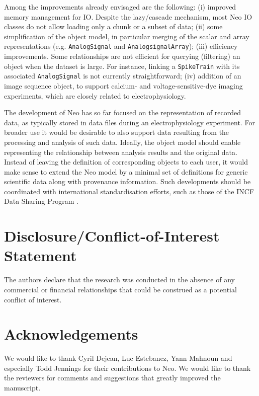 \documentclass{frontiers}
\begin{document}
Among the improvements already envisaged are the following:
(i) improved memory management for IO. Despite the lazy/cascade mechanism, most Neo IO classes do not allow loading only a chunk or a subset of data;
(ii) some simplification of the object model, in particular merging of the scalar and array representations (e.g. \lstinline`AnalogSignal` and \lstinline`AnalogsignalArray`);
(iii) efficiency improvements. Some relationships are not efficient for querying (filtering) an object when the dataset is large. For instance, linking a \lstinline`SpikeTrain` with its associated \lstinline`AnalogSignal` is not currently straightforward;
(iv) addition of an image sequence object, to support calcium- and voltage-sensitive-dye imaging experiments, which are closely related to electrophysiology.

The development of Neo has so far focused on the representation of recorded data, as typically stored in data files during an electrophysiology experiment.
For broader use it would be desirable to also support data resulting from the processing and analysis of such data.
Ideally, the object model should enable representing the relationship between analysis results and the original data.
Instead of leaving the definition of corresponding objects to each user, it would make sense to extend the Neo model by a minimal set of definitions for generic scientific data along with provenance information.
Such developments should be coordinated with international standardisation efforts, such as those of the INCF Data Sharing Program \citep{Teeters2013}.

\section*{Disclosure/Conflict-of-Interest Statement}
The authors declare that the research was conducted in the absence of any commercial or financial relationships that could be construed as a potential conflict of interest.

\section*{Acknowledgements}
We would like to thank Cyril Dejean, Luc Estebanez, Yann Mahnoun and especially Todd Jennings for their contributions to Neo. We would like to thank the reviewers for comments and suggestions that greatly improved the manuscript.
\end{document}
